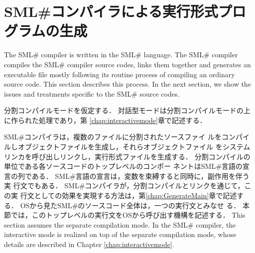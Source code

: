 \documentclass{jbook}
\newif\ifjp
\newcommand{\txt}[2]{#1}
\newcommand{\smlsharp}{SML\#}
\newcommand{\code}[1]{\mbox{\large\tt #1}}
\begin{document}
\section{\txt{\smlsharp{}コンパイラによる実行形式プログラムの生成}{Creating an
executable command by \smlsharp{} compiler}}
\label{sec:SimpleMain.generateExec}

\ifjp%
	\smlsharp{}コンパイラは，\smlsharp{}言語のソースコードとして書か
れている．
	\smlsharp{}コンパイラコマンド\code{smlsharp}も，ほぼ通常の
\smlsharp{}言語のソースコードと同様にコンパイル・リンクされ，実行ファイ
ルとして生成される．
	本節では，\smlsharp{}コンパイラが通常のソースファイルをコンパイ
ルし，OSから起動できる実行形式コマンドを生成する機構を記述する．
	次節で，\smlsharp{}コンパイラソースコード特有の処理を記述する．
\else%
	The \smlsharp{} compiler is written in the \smlsharp{} language.
	The \smlsharp{} compiler compiles the \smlsharp{} compiler
source codes, links them together and generates an executable file
mostly following its routine process of compiling an ordinary source
code.
	This section describes this process.
	In the next section, we show the issues and treatments specific
to the \smlsharp{} source codes.
\fi%

\ifjp%
	分割コンパイルモードを仮定する．
	対話型モードは分割コンパイルモードの上に作られた処理であり，第
\ref{chap:interactivemode}章で記述する．

	\smlsharp{}コンパイラは，複数のファイルに分割されたソースファイ
ルをコンパイルしオブジェクトファイルを生成し，それらオブジェクトファイル
をシステムリンカを呼び出しリンクし，実行形式ファイルを生成する．
	分割コンパイルの単位である各ソースコードのトップレベルのコンポー
ネントは\smlsharp{}言語の宣言の列である．
	\smlsharp{}言語の宣言は，変数を束縛すると同時に，副作用を伴う実
行文でもある．
	\smlsharp{}コンパイラが，分割コンパイルとリンクを通じて，この実
行文としての効果を実現する方法は，第\ref{chap:GenerateMain}章で記述する．
	OSから見た\smlsharp{}のソースコード全体は，一つの実行文とみなせ
る．
	本節では，このトップレベルの実行文をOSから呼び出す機構を記述する．
\else%
	This section assumes the separate compilation mode.
	In the \smlsharp{} compiler, the interactive mode is realized
on top of the separate compilation mode, whose details are described in
Chapter \ref{chap:interactivemode}.
\end{document}
